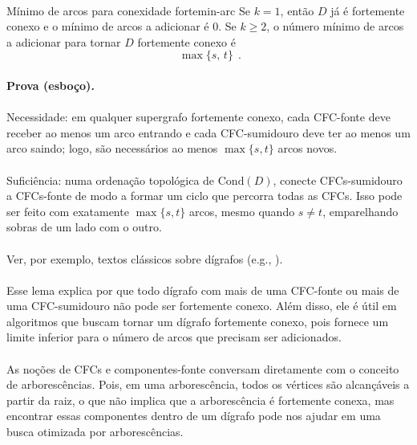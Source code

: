\documentclass[12pt,a4paper]{article}
\def\emph#1{#1}%
\begin{document}
\paragraph{}
\begin{lemabox}{Mínimo de arcos para conexidade forte}{min-arc}
    Se $k=1$, então $D$ já é fortemente conexo e o mínimo de arcos a adicionar é $0$. Se $k\ge 2$, o número mínimo de arcos a adicionar para tornar $D$ fortemente conexo é \[\boxed{\;\max\{s,\,t\}\;}\,.\]

    \paragraph{}
    \textbf{Prova (esboço).}
    \paragraph{}
    \emph{Necessidade:} em qualquer supergrafo fortemente conexo, cada CFC-fonte deve receber ao menos um arco \emph{entrando} e cada CFC-sumidouro deve ter ao menos um arco \emph{saindo}; logo, são necessários ao menos $\max\{s,t\}$ arcos novos.

    \paragraph{}
    \emph{Suficiência:} numa ordenação topológica de $\mathrm{Cond}(D)$, conecte CFCs-sumidouro a CFCs-fonte de modo a formar um ciclo que percorra todas as CFCs. Isso pode ser feito com exatamente $\max\{s,t\}$ arcos, mesmo quando $s\ne t$, emparelhando sobras de um lado com o outro.

    \paragraph{}
    Ver, por exemplo, textos clássicos sobre dígrafos (e.g., \cite{schrijver2003comb}).
\end{lemabox}

\paragraph{}
Esse lema explica por que todo dígrafo com mais de uma CFC-fonte ou mais de uma CFC-sumidouro não pode ser fortemente conexo. Além disso, ele é útil em algoritmos que buscam tornar um dígrafo fortemente conexo, pois fornece um limite inferior para o número de arcos que precisam ser adicionados.

\paragraph{}
As noções de CFCs e componentes-fonte conversam diretamente com o conceito de \emph{arborescências}. Pois, em uma arborescência, todos os vértices são alcançáveis a partir da raiz, o que não implica que a arborescência é fortemente conexa, mas encontrar essas componentes dentro de um dígrafo pode nos ajudar em uma busca otimizada por arborescências.
\end{document}
